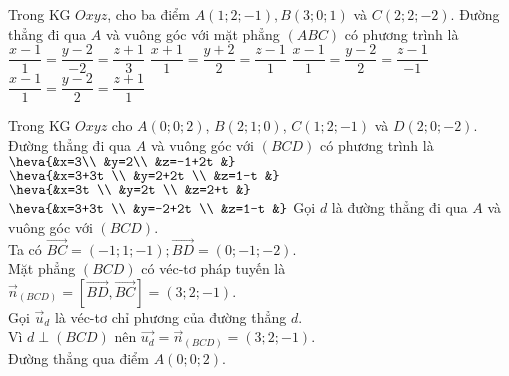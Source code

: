 \begin{ex}%
	Trong KG $Oxyz$, cho ba điểm $A(1; 2;-1), B(3; 0; 1)$ và $C(2; 2;-2)$. Đường thẳng đi qua $A$ và vuông góc với mặt phẳng $(ABC)$ có phương trình là
	\choice
	{\True $\dfrac{x-1}{1}=\dfrac{y-2}{-2}=\dfrac{z+1}{3}$}
	{$\dfrac{x+1}{1}=\dfrac{y+2}{2}=\dfrac{z-1}{1}$}
	{$\dfrac{x-1}{1}=\dfrac{y-2}{2}=\dfrac{z-1}{-1}$}
	{$\dfrac{x-1}{1}=\dfrac{y-2}{2}=\dfrac{z+1}{1}$}
\end{ex}
\begin{ex}%
	Trong KG $Oxyz$ cho $A(0; 0; 2)$, $B(2; 1; 0)$, $C(1; 2;-1)$ và $D(2; 0;-2)$. Đường thẳng đi qua $A$ và vuông góc với $(BCD)$ có phương trình là
	\choice
	{$\heva{&x=3\\
			&y=2\\
			&z=-1+2t
			&}$}
	{\True $\heva{&x=3+3t \\
			&y=2+2t \\
			&z=1-t
			&}$}
	{$\heva{&x=3t \\
			&y=2t \\
			&z=2+t
			&}$}
	{$\heva{&x=3+3t \\
			&y=-2+2t \\
			&z=1-t
			&}$}
	\loigiai
		{Gọi $d$ là đường thẳng đi qua $A$ và vuông góc với $(BCD)$.\\
		Ta có $\overrightarrow{BC}=(-1; 1;-1); \overrightarrow{BD}=(0;-1;-2)$.\\
		Mặt phẳng $(BCD)$ có véc-tơ pháp tuyến là $\overrightarrow{n}_{(BCD)}=\left[\overrightarrow{BD}, \overrightarrow{BC}\right]=(3; 2;-1)$.\\
		Gọi $\overrightarrow{u}_d$ là véc-tơ chỉ phương của đường thẳng $d$.\\
		Vì $d \perp(BCD)$ nên $\overrightarrow{u_d}=\overrightarrow{n}_{(BCD)}=(3; 2;-1)$.\\
		Đường thẳng qua điểm $A(0; 0; 2)$.
	}
\end{ex}
